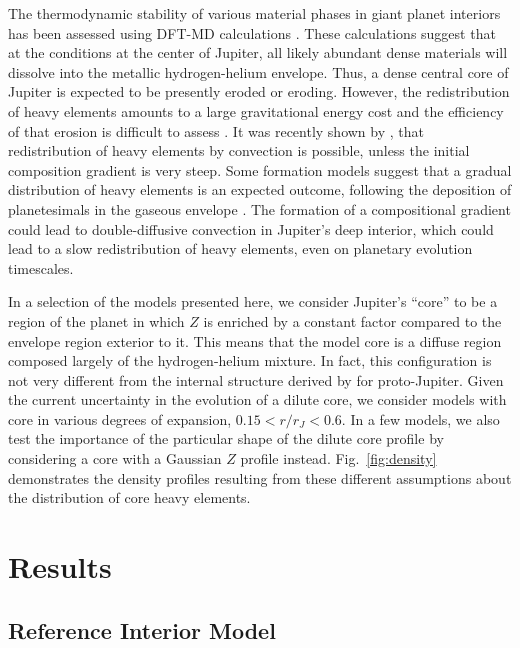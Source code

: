 The thermodynamic stability of various material phases in giant planet
interiors has been assessed using DFT-MD calculations
\citep{Wilson2012a,wilson12b,Wahl2013,Gonzalez2013}.  These calculations
suggest that at the conditions at the center of Jupiter, all likely abundant
dense materials will dissolve into the metallic hydrogen-helium envelope. Thus,
a dense central core of Jupiter is expected to be presently eroded or eroding.
However, the redistribution of heavy elements amounts to a large gravitational
energy cost and the efficiency of that erosion is difficult to assess
\citep[see][]{Guillot2004}.  It was recently shown by \citet{vazan2016},  that
redistribution of heavy elements by convection is possible, unless the initial
composition gradient is very steep.  Some formation models suggest that a
gradual distribution of heavy elements is an expected outcome, following the
deposition of planetesimals in the gaseous envelope \citep{lozovsky2017}. The
formation of a compositional gradient could lead to double-diffusive convection
\citep{Chabrier2007,Leconte2013} in Jupiter's deep interior, which could lead
to a slow redistribution of heavy elements, even on planetary evolution
timescales.

In a selection of the models presented here, we consider Jupiter's ``core'' to
be a region of the planet in which $Z$ is enriched by a constant factor
compared to the envelope region exterior to it. This means that the model core
is a diffuse region composed largely of the hydrogen-helium mixture. In fact,
this configuration is not very different from the internal structure derived by
\citet{lozovsky2017} for proto-Jupiter.  Given the current uncertainty in the
evolution of a dilute core, we consider models with core in various degrees of
expansion, $0.15<r/r_J<0.6$.  In a few models, we also test the importance of
the particular shape of the dilute core profile by considering a core with a
Gaussian $Z$ profile instead.  Fig.~\ref{fig:density} demonstrates the density
profiles resulting from these different assumptions about the distribution of
core heavy elements. 

\section{Results} \label{sec:juno_results}

\subsection{Reference Interior Model}


